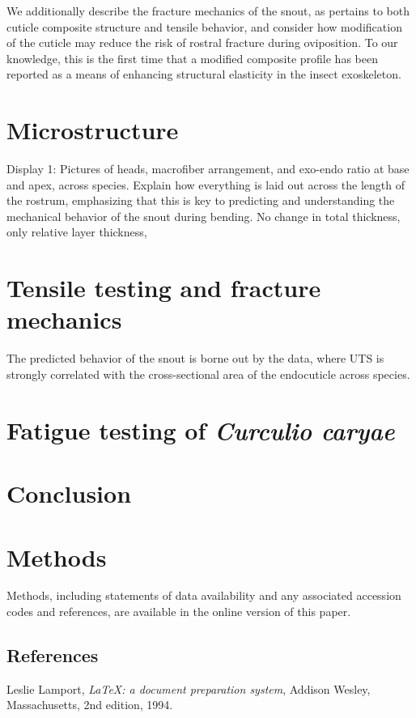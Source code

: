 \documentclass[twocolumn, linenumbers, superscriptaddress]{revtex4-1}
\begin{document}
	We additionally describe the fracture mechanics of the snout, as pertains to both cuticle composite structure and tensile behavior, and consider how modification of the cuticle may reduce the risk of rostral fracture during oviposition.
	To our knowledge, this is the first time that a modified composite profile has been reported as a means of enhancing structural elasticity in the insect exoskeleton.

	\section{Microstructure}\label{sec:microstructure} 
		Display 1: Pictures of heads, macrofiber arrangement, and exo-endo ratio at base and apex, across species.
		Explain how everything is laid out across the length of the rostrum, emphasizing that this is key to predicting and understanding the mechanical behavior of the snout during bending.
		No change in total thickness, only relative layer thickness,
	
	\section{Tensile testing and fracture mechanics}
		The predicted behavior of the snout is borne out by the data, where UTS is strongly correlated with the cross-sectional area of the endocuticle across species.
		
	\section{Fatigue testing of \textit{Curculio caryae}}

	\section{Conclusion}

	\section{Methods}
		Methods, including statements of data availability and any associated accession codes and references, are available in the online version of this paper.
	
	\begin{thebibliography}{50}
		\section*{References}	
			Leslie Lamport,
			\textit{\LaTeX: a document preparation system},
			Addison Wesley, Massachusetts,
			2nd edition,
			1994.

	\end{thebibliography}
\end{document}

